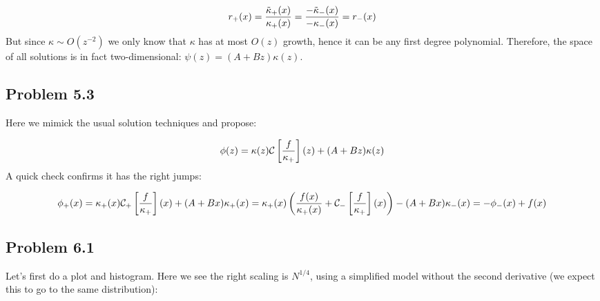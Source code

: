 \documentclass[12pt,a4paper]{article}
\def\CC{ {\cal C} }
\def\br[#1]{\left[{#1}\right]}
\begin{document}
\[
r_+(x) = {\tilde \kappa_+(x) \over \kappa_+(x) }  = {-\tilde \kappa_-(x) \over -\kappa_-(x) }  = r_-(x)
\]
But since $\kappa \sim O(z^{-2})$ we only know that $\kappa$ has at most $O(z)$ growth, hence it can be any first degree polynomial.  Therefore, the space of all solutions is in fact two-dimensional: $\psi(z) = (A + Bz) \kappa(z)$.

\subsection{Problem 5.3}
Here we mimick the usual solution techniques and propose:

\[
\phi(z) = \kappa(z) \CC\br[{f \over \kappa_+}](z) + (A+Bz) \kappa(z)
\]
A quick check confirms it has the right jumps:

\[
\phi_+(x) = \kappa_+(x) \CC_+\br[{f \over \kappa_+}](x) + (A+Bx) \kappa_+(x) =\kappa_+(x) \left({f(x) \over \kappa_+(x)} + \CC_-\br[{f \over \kappa_+}](x)\right) - (A+Bx) \kappa_-(x) = -\phi_-(x) + f(x)
\]
\subsection{Problem 6.1}
Let's first do a plot and histogram. Here we see the right scaling is $N^{1/4}$, using a simplified model without the second derivative (we expect this to go to the same distribution):
\end{document}

